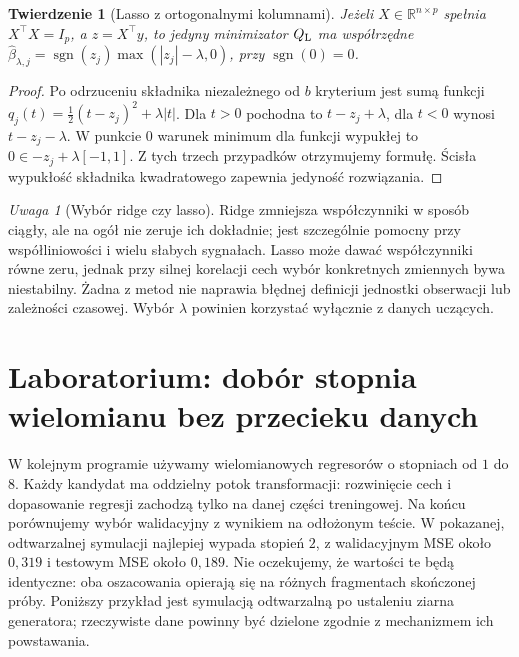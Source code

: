 \documentclass[11pt,a4paper,oneside]{report}
\numberwithin{equation}{chapter}
\theoremstyle{plain}
\newtheorem{twierdzenie}{Twierdzenie}[chapter]
\theoremstyle{definition}
\theoremstyle{remark}
\newtheorem{uwaga}{Uwaga}[chapter]
\newcommand{\R}{\mathbb R}
\begin{document}
\begin{twierdzenie}[Lasso z ortogonalnymi kolumnami]
\label{thm:lasso-soft}
Jeżeli $X\in\R^{n\times p}$ spełnia $X^\top X=I_p$,
a $z=X^\top y$, to jedyny minimizator $Q_{\rm L}$ ma
współrzędne
$\widehat\beta_{\lambda,j}=\operatorname{sgn}(z_j)
\max(|z_j|-\lambda,0)$, przy $\operatorname{sgn}(0)=0$.
\end{twierdzenie}
\begin{proof}
Po odrzuceniu składnika niezależnego od $b$ kryterium
jest sumą funkcji $q_j(t)=\frac12(t-z_j)^2+\lambda|t|$.
Dla $t>0$ pochodna to $t-z_j+\lambda$, dla $t<0$
wynosi $t-z_j-\lambda$. W punkcie $0$ warunek minimum
dla funkcji wypukłej to $0\in-z_j+\lambda[-1,1]$.
Z tych trzech przypadków otrzymujemy formułę.
Ścisła wypukłość składnika kwadratowego zapewnia
jedyność rozwiązania.
\end{proof}

\begin{uwaga}[Wybór ridge czy lasso]
Ridge zmniejsza współczynniki w sposób ciągły, ale na ogół
nie zeruje ich dokładnie; jest szczególnie pomocny przy
współliniowości i wielu słabych sygnałach.
Lasso może dawać współczynniki równe zeru, jednak przy
silnej korelacji cech wybór konkretnych zmiennych bywa
niestabilny. Żadna z metod nie naprawia błędnej definicji
jednostki obserwacji lub zależności czasowej. Wybór
$\lambda$ powinien korzystać wyłącznie z danych uczących.
\end{uwaga}

\section{Laboratorium: dobór stopnia wielomianu bez przecieku danych}
W kolejnym programie używamy wielomianowych regresorów
o stopniach od $1$ do $8$. Każdy kandydat ma oddzielny
potok transformacji: rozwinięcie cech i dopasowanie
regresji zachodzą tylko na danej części treningowej.
Na końcu porównujemy wybór walidacyjny z wynikiem na
odłożonym teście. W pokazanej, odtwarzalnej symulacji
najlepiej wypada stopień $2$, z walidacyjnym MSE około
$0{,}319$ i testowym MSE około $0{,}189$. Nie oczekujemy,
że wartości te będą identyczne: oba oszacowania opierają
się na różnych fragmentach skończonej próby.
Poniższy przykład jest symulacją
odtwarzalną po ustaleniu ziarna generatora; rzeczywiste
dane powinny być dzielone zgodnie z mechanizmem ich
powstawania.
\end{document}
